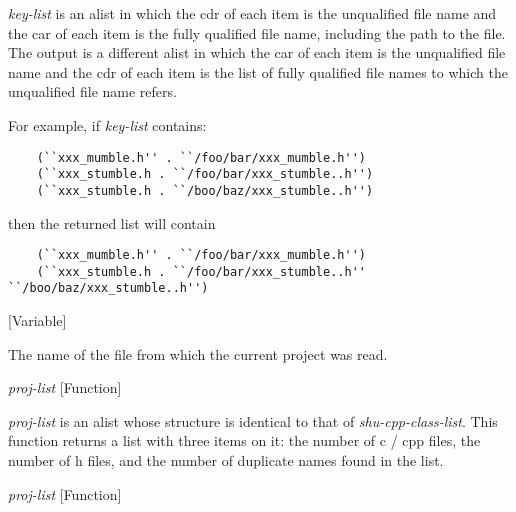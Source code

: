 \begin{doc-string}
\emph{key-list} is an alist in which the cdr of each item is the unqualified file name
and the car of each item is the fully qualified file name, including the path to
the file.  The output is a different alist in which the car of each item is the
unqualified file name and the cdr of each item is the list of fully qualified
file names to which the unqualified file name refers.

For example, if \emph{key-list} contains:

\small{\begin{verbatim}
    (``xxx_mumble.h'' . ``/foo/bar/xxx_mumble.h'')
    (``xxx_stumble.h . ``/foo/bar/xxx_stumble..h'')
    (``xxx_stumble.h . ``/boo/baz/xxx_stumble..h'')
\end{verbatim}}

then the returned list will contain

\small{\begin{verbatim}
    (``xxx_mumble.h'' . ``/foo/bar/xxx_mumble.h'')
    (``xxx_stumble.h . ``/foo/bar/xxx_stumble..h'' ``/boo/baz/xxx_stumble..h'')
\end{verbatim}}
\end{doc-string}

\vspace{1em}
\noindent
{}
\usebox{\funcname}
 \hfill [Variable]

\begin{doc-string}
The name of the file from which the current project was read.
\end{doc-string}

\vspace{1em}
\noindent
{}
\usebox{\funcname}\emph{proj-list}
 \hfill [Function]

\begin{doc-string}
\emph{proj-list} is an alist whose structure is identical to that of \emph{shu-cpp-class-list}.
This function returns a list with three items on it: the number of c / cpp files, the
number of h files, and the number of duplicate names found in the list.
\end{doc-string}

\vspace{1em}
\noindent
{}
\usebox{\funcname}\emph{proj-list}
 \hfill [Function]

